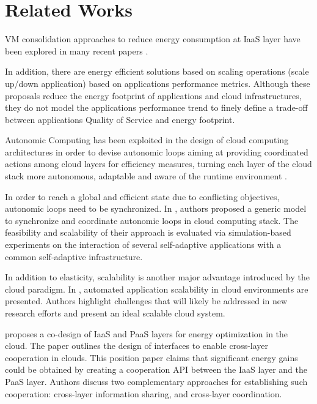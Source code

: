 \section{Related Works}
\label{sec: relworks}

VM consolidation approaches to reduce energy consumption at IaaS layer have been explored in many recent papers \cite{Cardosa} \cite{Schroder} \cite{Hermenier2009} \cite{sheikhalishahi_multi-capacity_2014} \cite{dupont2015plug4green}.

In addition, there are energy efficient solutions based on scaling operations (scale up/down application) based on applications performance metrics.
Although these proposals reduce the energy footprint of applications and cloud infrastructures, they do not model the applications performance trend to finely define a trade-off between applications Quality of Service and energy footprint.

Autonomic Computing has been exploited in the design of cloud computing architectures in order to devise autonomic loops aiming at providing coordinated actions among cloud layers for efficiency measures, turning each layer of the cloud stack more autonomous, adaptable and aware of the runtime environment \cite{alvares_de_oliveira_synchronization_2012} \cite{de_oliveira_framework_2013}.

In order to reach a global and efficient state due to conflicting objectives, autonomic loops need to be synchronized.
In \cite{alvares_de_oliveira_synchronization_2012}, authors proposed a generic model to synchronize and coordinate autonomic loops in cloud computing stack. 
The feasibility and scalability of their approach is evaluated via simulation-based experiments on the interaction of several self-adaptive applications with a common self-adaptive infrastructure.

In addition to elasticity, scalability is another major advantage introduced by the cloud paradigm.
In \cite{vaquero_dynamically_2011}, automated application scalability in cloud environments are presented.
Authors highlight challenges that will likely be addressed in new research efforts and present an ideal scalable cloud system.

\cite{carpen-amarie_towards_2014} proposes a co-design of IaaS and PaaS layers for energy optimization in the cloud.
The paper outlines the design of interfaces to enable cross-layer cooperation in clouds.
This position paper claims that significant energy gains could be obtained by creating a cooperation API between the IaaS layer and the PaaS layer.
Authors discuss two complementary approaches for establishing such cooperation: cross-layer information sharing, and cross-layer coordination.
